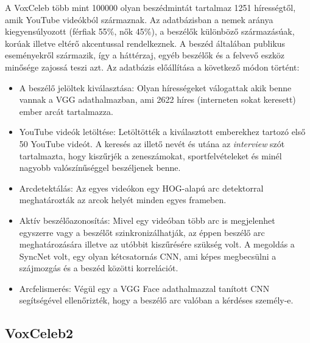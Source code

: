 \bigskip
A VoxCeleb több mint 100000 olyan beszédmintát tartalmaz 1251 hírességtől, amik YouTube videókból származnak. Az adatbázisban a nemek aránya kiegyensúlyozott (férfiak 55\%, nők 45\%), a beszélők különböző származásúak, korúak illetve eltérő akcentussal rendelkeznek. A beszéd általában publikus eseményekről származik, így a háttérzaj, egyéb beszélők és a felvevő eszköz minősége zajossá teszi azt.
\newline
\newline
Az adatbázis előállítása a következő módon történt:
\begin{itemize}
	\item A beszélő jelöltek kiválasztása:  Olyan hírességeket válogattak akik benne vannak a VGG adathalmazban, ami 2622 híres (interneten sokat keresett) ember arcát tartalmazza.
	\item YouTube videók letöltése: Letöltötték a kiválasztott emberekhez tartozó első 50 YouTube videót. A keresés az illető nevét és utána az \emph{interview} szót tartalmazta, hogy kiszűrjék a zeneszámokat, sportfelvételeket és minél nagyobb valószínűséggel beszéljenek benne.
	\item Arcdetektálás: Az egyes videókon egy HOG-alapú arc detektorral meghatározták az arcok helyét minden egyes frameben.
	\item Aktív beszélőazonosítás: Mivel egy videóban több arc is megjelenhet egyszerre vagy a beszélőt szinkronizálhatják, az éppen beszélő arc meghatározására illetve az utóbbit kiszűrésére szükség volt. A megoldás a SyncNet volt, egy olyan kétcsatornás CNN, ami képes megbecsülni a szájmozgás és a beszéd közötti korrelációt.
	\item Arcfelismerés: Végül egy a VGG Face adathalmazzal tanított CNN segítségével ellenőrizték, hogy a beszélő arc valóban a kérdéses személy-e.
\end{itemize}

\subsection{VoxCeleb2} \label{voxceleb2}

